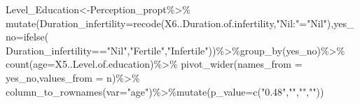 \documentclass[
]{article}
\newenvironment{Shaded}{\begin{snugshade}}{\end{snugshade}}
\newcommand{\AttributeTok}[1]{\textcolor[rgb]{0.77,0.63,0.00}{#1}}
\newcommand{\FunctionTok}[1]{\textcolor[rgb]{0.00,0.00,0.00}{#1}}
\newcommand{\NormalTok}[1]{#1}
\newcommand{\OtherTok}[1]{\textcolor[rgb]{0.56,0.35,0.01}{#1}}
\newcommand{\SpecialCharTok}[1]{\textcolor[rgb]{0.00,0.00,0.00}{#1}}
\newcommand{\StringTok}[1]{\textcolor[rgb]{0.31,0.60,0.02}{#1}}
\begin{document}
\begin{Shaded}
\begin{Highlighting}[]
\NormalTok{Level\_Education}\OtherTok{\textless{}{-}}\NormalTok{Perception\_propt}\SpecialCharTok{\%\textgreater{}\%}
  \FunctionTok{mutate}\NormalTok{(}\AttributeTok{Duration\_infertility=}\FunctionTok{recode}\NormalTok{(X6..Duration.of.infertility,}\StringTok{"Nil:"}\OtherTok{=}\StringTok{"Nil"}\NormalTok{),}\AttributeTok{yes\_no=}\FunctionTok{ifelse}\NormalTok{(}
\NormalTok{  Duration\_infertility}\SpecialCharTok{==}\StringTok{"Nil"}\NormalTok{,}\StringTok{"Fertile"}\NormalTok{,}\StringTok{"Infertile"}\NormalTok{))}\SpecialCharTok{\%\textgreater{}\%}\FunctionTok{group\_by}\NormalTok{(yes\_no)}\SpecialCharTok{\%\textgreater{}\%}
  \FunctionTok{count}\NormalTok{(}\AttributeTok{age=}\NormalTok{X5..Level.of.education)}\SpecialCharTok{\%\textgreater{}\%}
  \FunctionTok{pivot\_wider}\NormalTok{(}\AttributeTok{names\_from =}\NormalTok{ yes\_no,}\AttributeTok{values\_from =}\NormalTok{ n)}\SpecialCharTok{\%\textgreater{}\%}
  \FunctionTok{column\_to\_rownames}\NormalTok{(}\AttributeTok{var=}\StringTok{"age"}\NormalTok{)}\SpecialCharTok{\%\textgreater{}\%}\FunctionTok{mutate}\NormalTok{(}\AttributeTok{p\_value=}\FunctionTok{c}\NormalTok{(}\StringTok{"0.48"}\NormalTok{,}\StringTok{""}\NormalTok{,}\StringTok{""}\NormalTok{,}\StringTok{""}\NormalTok{))}


\end{Highlighting}
\end{Shaded}
\end{document}
